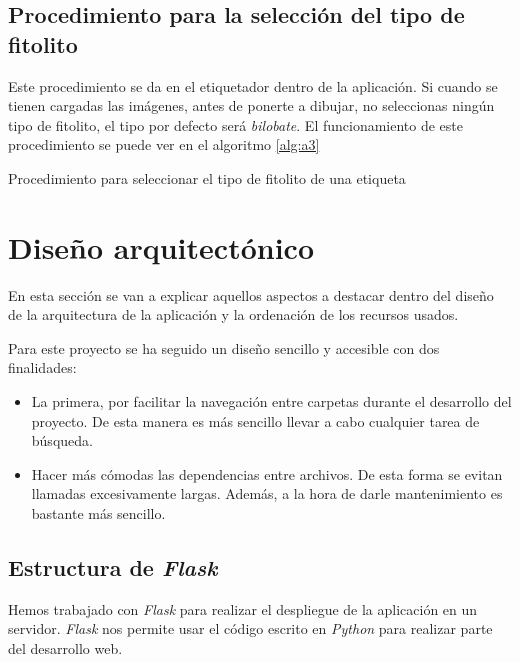 \subsection{Procedimiento para la selección del tipo de fitolito}

Este procedimiento se da en el etiquetador dentro de la aplicación.
Si cuando se tienen cargadas las imágenes, antes de ponerte a dibujar, no seleccionas ningún tipo de fitolito, el tipo por defecto será \textit{bilobate}.
El funcionamiento de este procedimiento se puede ver en el algoritmo \ref{alg:a3}

\begin{algorithm}

		{
		}
		
	\caption{Procedimiento para seleccionar el tipo de fitolito de una etiqueta}
	\label{alg:a3}
\end{algorithm}
\section{Diseño arquitectónico}

En esta sección se van a explicar aquellos aspectos a destacar dentro del diseño de la arquitectura de la aplicación y la ordenación de los recursos usados.

Para este proyecto se ha seguido un diseño sencillo y accesible con dos finalidades:

\begin{itemize}
	\item La primera, por facilitar la navegación entre carpetas durante el desarrollo del proyecto. De esta manera es más sencillo llevar a cabo cualquier tarea de búsqueda.
	
	\item Hacer más cómodas las dependencias entre archivos. De esta forma se evitan llamadas excesivamente largas. Además, a la hora de darle mantenimiento es bastante más sencillo.
\end{itemize}

\subsection{Estructura de \textit{Flask}}

Hemos trabajado con \textit{Flask} para realizar el despliegue de la aplicación en un servidor. \textit{Flask} nos permite usar el código escrito en \textit{Python} para realizar parte del desarrollo web.

